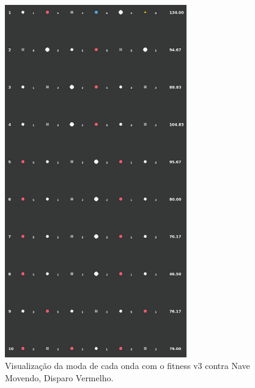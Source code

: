 \begin{figure}[H]
  \centering
  \includegraphics[width=0.7\textwidth]{figuras/ss/ss_redmove_ai_mode_2_1.png}
  \caption{Visualização da moda de cada onda com o fitness v3 contra Nave Movendo, Disparo Vermelho.}
  \label{fig:ss-moda-rm-2-1}
\end{figure}

